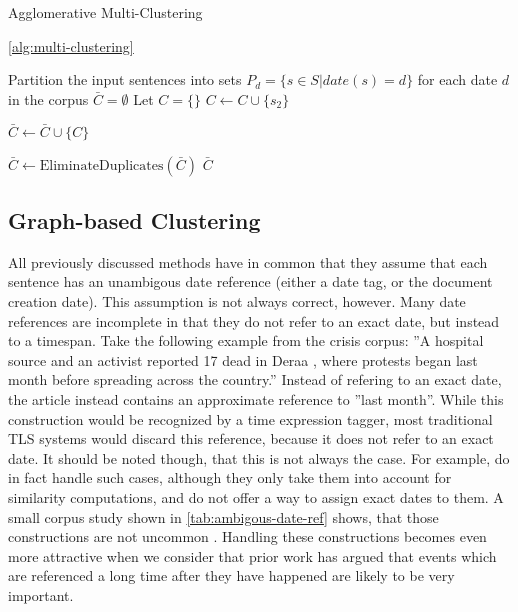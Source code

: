 \documentclass[a4paper,BCOR=10mm]{report}
\begin{document}
 \begin{algorithm}
 \caption{Agglomerative Multi-Clustering}
 \ref{alg:multi-clustering}
 \begin{algorithmic}
    \STATE Partition the input sentences into sets $P_d = \{ s \in S | date(s) = d \}$ for each date $d$ in the corpus
    \STATE $\bar{C} = \emptyset$
            \STATE Let $C = \{  \}$
                    \STATE $C \leftarrow C \cup \{ s_2 \}$
                \ENDIF
            \ENDFOR

                \STATE $\bar{C} \leftarrow \bar{C} \cup \{ C \}$
            \ENDIF
        \ENDFOR

    \ENDFOR
    \STATE $\bar{C} \leftarrow \text{EliminateDuplicates}(\bar{C})$
    \RETURN $\bar{C}$

\end{algorithmic}
\end{algorithm}

\subsection{Graph-based Clustering}

All previously discussed methods have in common that they assume that each sentence has an unambigous date reference (either a date tag, or the document creation date).
This assumption is not always correct, however. Many date references are incomplete in that they do not refer to an exact date, but instead to a timespan. Take the following example from the crisis corpus: ''A hospital source and an activist reported 17 dead in Deraa , where protests began last month before spreading across the country.'' %
Instead of refering to an exact date, the article instead contains an approximate reference to ''last month''. While this construction would be recognized by a time expression tagger, most traditional TLS systems would discard this reference, because it does not refer to an exact date.
 It should be noted though, that this is not always the case. For example, \citet{chieu} do in fact handle such cases, although they only take them into account for similarity computations, and do not offer a way to assign exact dates to them.
A small corpus study shown in \ref{tab:ambigous-date-ref} shows, that those constructions are not uncommon . %
Handling these constructions becomes even more attractive when we consider that prior work has argued that events which are referenced a long time after they have happened are likely to be very important. %
\end{document}
